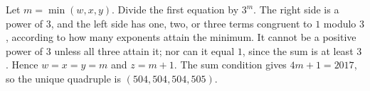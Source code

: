 Let $m=\min(w,x,y)$. Divide the first equation by $3^m$. The right side is a power of $3$, and the left side has one, two, or three terms congruent to $1$ modulo $3$, according to how many exponents attain the minimum. It cannot be a positive power of $3$ unless all three attain it; nor can it equal $1$, since the sum is at least $3$. Hence $w=x=y=m$ and $z=m+1$. The sum condition gives $4m+1=2017$, so the unique quadruple is $\boxed{(504,504,504,505)}$.
